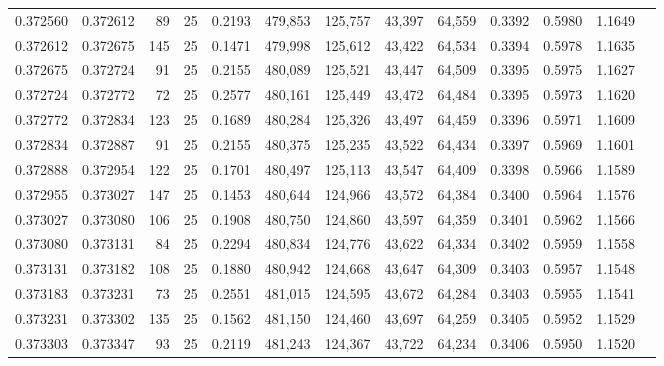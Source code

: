 \begin{tabular}{rrrrrrrrrrrrr}
0.372560 & 0.372612 &    89 &  25 &                                     0.2193 & 479,853 & 125,757 &  43,397 &  64,559 & 0.3392 & 0.5980 & 1.1649 \\
0.372612 & 0.372675 &   145 &  25 &                                     0.1471 & 479,998 & 125,612 &  43,422 &  64,534 & 0.3394 & 0.5978 & 1.1635 \\
0.372675 & 0.372724 &    91 &  25 &                                     0.2155 & 480,089 & 125,521 &  43,447 &  64,509 & 0.3395 & 0.5975 & 1.1627 \\
0.372724 & 0.372772 &    72 &  25 &                                     0.2577 & 480,161 & 125,449 &  43,472 &  64,484 & 0.3395 & 0.5973 & 1.1620 \\
0.372772 & 0.372834 &   123 &  25 &                                     0.1689 & 480,284 & 125,326 &  43,497 &  64,459 & 0.3396 & 0.5971 & 1.1609 \\
0.372834 & 0.372887 &    91 &  25 &                                     0.2155 & 480,375 & 125,235 &  43,522 &  64,434 & 0.3397 & 0.5969 & 1.1601 \\
0.372888 & 0.372954 &   122 &  25 &                                     0.1701 & 480,497 & 125,113 &  43,547 &  64,409 & 0.3398 & 0.5966 & 1.1589 \\
0.372955 & 0.373027 &   147 &  25 &                                     0.1453 & 480,644 & 124,966 &  43,572 &  64,384 & 0.3400 & 0.5964 & 1.1576 \\
0.373027 & 0.373080 &   106 &  25 &                                     0.1908 & 480,750 & 124,860 &  43,597 &  64,359 & 0.3401 & 0.5962 & 1.1566 \\
0.373080 & 0.373131 &    84 &  25 &                                     0.2294 & 480,834 & 124,776 &  43,622 &  64,334 & 0.3402 & 0.5959 & 1.1558 \\
0.373131 & 0.373182 &   108 &  25 &                                     0.1880 & 480,942 & 124,668 &  43,647 &  64,309 & 0.3403 & 0.5957 & 1.1548 \\
0.373183 & 0.373231 &    73 &  25 &                                     0.2551 & 481,015 & 124,595 &  43,672 &  64,284 & 0.3403 & 0.5955 & 1.1541 \\
0.373231 & 0.373302 &   135 &  25 &                                     0.1562 & 481,150 & 124,460 &  43,697 &  64,259 & 0.3405 & 0.5952 & 1.1529 \\
0.373303 & 0.373347 &    93 &  25 &                                     0.2119 & 481,243 & 124,367 &  43,722 &  64,234 & 0.3406 & 0.5950 & 1.1520 \\

\end{tabular}
